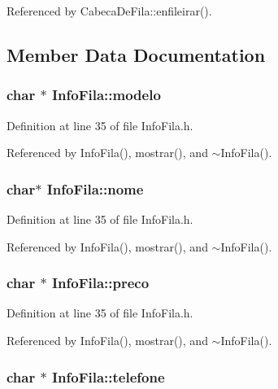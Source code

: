 Referenced by CabecaDeFila::enfileirar().



\subsection{Member Data Documentation}
\hypertarget{classInfoFila_aad74e3cb039d5f01ee37dbf773b07948}{
\subsubsection[{modelo}]{\setlength{\rightskip}{0pt plus 5cm}char $\ast$ {\bf InfoFila::modelo}}}
\label{classInfoFila_aad74e3cb039d5f01ee37dbf773b07948}


Definition at line 35 of file InfoFila.h.



Referenced by InfoFila(), mostrar(), and $\sim$InfoFila().

\hypertarget{classInfoFila_acf4cfe03a2a0b010e53536d02aafae7d}{
\subsubsection[{nome}]{\setlength{\rightskip}{0pt plus 5cm}char$\ast$ {\bf InfoFila::nome}}}
\label{classInfoFila_acf4cfe03a2a0b010e53536d02aafae7d}


Definition at line 35 of file InfoFila.h.



Referenced by InfoFila(), mostrar(), and $\sim$InfoFila().

\hypertarget{classInfoFila_a72e9667faf3a9c779e27811c15868d9c}{
\subsubsection[{preco}]{\setlength{\rightskip}{0pt plus 5cm}char $\ast$ {\bf InfoFila::preco}}}
\label{classInfoFila_a72e9667faf3a9c779e27811c15868d9c}


Definition at line 35 of file InfoFila.h.



Referenced by InfoFila(), mostrar(), and $\sim$InfoFila().

\hypertarget{classInfoFila_af9e1cef9a6da2e844d2ef97a115a1522}{
\subsubsection[{telefone}]{\setlength{\rightskip}{0pt plus 5cm}char $\ast$ {\bf InfoFila::telefone}}}
\label{classInfoFila_af9e1cef9a6da2e844d2ef97a115a1522}


